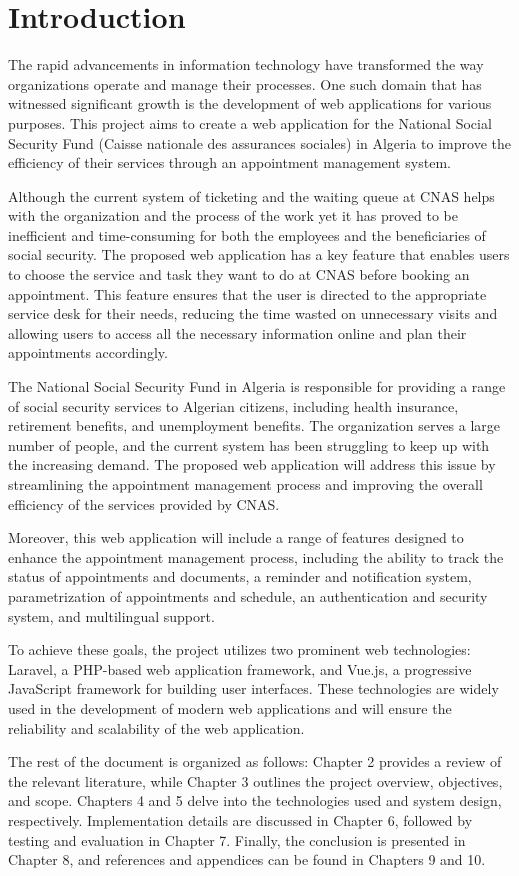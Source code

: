 \section{Introduction}

The rapid advancements in information technology have transformed the way organizations operate and manage their processes. One such domain that has witnessed significant growth is the development of web applications for various purposes. This project aims to create a web application for the National Social Security Fund (Caisse nationale des assurances sociales) in Algeria to improve the efficiency of their services through an appointment management system.

Although the current system of ticketing and the waiting queue at CNAS helps with the organization and the process of the work yet it has proved to be inefficient and time-consuming for both the employees and the beneficiaries of social security. The proposed web application has a key feature that enables users to choose the service and task they want to do at CNAS before booking an appointment. This feature ensures that the user is directed to the appropriate service desk for their needs, reducing the time wasted on unnecessary visits and allowing users to access all the necessary information online and plan their appointments accordingly.

The National Social Security Fund in Algeria is responsible for providing a range of social security services to Algerian citizens, including health insurance, retirement benefits, and unemployment benefits. The organization serves a large number of people, and the current system has been struggling to keep up with the increasing demand. The proposed web application will address this issue by streamlining the appointment management process and improving the overall efficiency of the services provided by CNAS. 

Moreover, this web application will include a range of features designed to enhance the appointment management process, including the ability to track the status of appointments and documents, a reminder and notification system, parametrization of appointments and schedule, an authentication and security system, and multilingual support.

To achieve these goals, the project utilizes two prominent web technologies: Laravel, a PHP-based web application framework, and Vue.js, a progressive JavaScript framework for building user interfaces. These technologies are widely used in the development of modern web applications and will ensure the reliability and scalability of the web application.

The rest of the document is organized as follows: Chapter 2 provides a review of the relevant literature, while Chapter 3 outlines the project overview, objectives, and scope. Chapters 4 and 5 delve into the technologies used and system design, respectively. Implementation details are discussed in Chapter 6, followed by testing and evaluation in Chapter 7. Finally, the conclusion is presented in Chapter 8, and references and appendices can be found in Chapters 9 and 10.